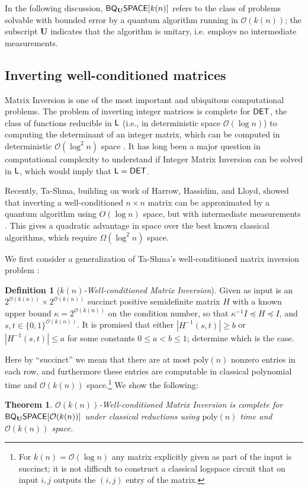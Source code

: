 \documentclass[11pt]{article}
\newtheorem{theorem}{Theorem}
\theoremstyle{definition}
\theoremstyle{remark}
\theoremstyle{definition}
\newtheorem{definition}{Definition}
\newcommand\DET{{\sf{DET}}}
\newcommand\Logspace{{\sf{L}}}
\newcommand\matrixinvert[1]{{\ensuremath{#1}}\textit{-Well-conditioned Matrix Inversion}}
\newcommand{\classfont}{\sf}
\newcommand{\Unitary}{\mathbf{U}}
\newcommand{\unitaryBQSPACE}[1]{{\classfont{BQ}_\Unitary\classfont{SPACE}}[#1]}
\newcommand\bigoh{\mathcal{O}}
\newcommand{\poly}{\textrm{poly}}
\begin{document}
In the following discussion, $\unitaryBQSPACE{k(n)}$ refers to the class of problems solvable with bounded error by a quantum algorithm running in $\mathcal{O}(k(n))$; the subscript $\Unitary$ indicates that the algorithm is unitary, i.e. employs no intermediate measurements.
\subsection{Inverting well-conditioned matrices}
Matrix Inversion is one of the most important and ubiquitous computational problems.  The problem of inverting integer matrices is complete for $\DET$, the class of functions reducible in $\Logspace$ (i.e., in deterministic space $\bigoh(\log{n})$) to computing the determinant of an integer matrix, which can be computed in deterministic $\bigoh(\log^2{n})$ space \cite{berkowitz, cook}.  It has long been a major question in computational complexity to understand if Integer Matrix Inversion can be solved in $\Logspace$, which would imply that $\Logspace=\DET$.

Recently, Ta-Shma, building on work of Harrow, Hassidim, and Lloyd, showed that inverting a well-conditioned $n \times n$ matrix can be approximated by a quantum algorithm using $O(\log n)$ space, but with intermediate measurements \cite{tashma,HHL}. This gives a quadratic advantage in space over the best known classical algorithms, which require $\Omega(\log^2n)$ space.

We first consider a generalization of Ta-Shma's well-conditioned matrix inversion problem \cite{tashma}:\begin{definition}[\matrixinvert{k(n)}]
	Given as input is an $2^{\bigoh (k(n))} \times 2^{\bigoh (k(n))}$ succinct positive semidefinite matrix $H$ with a known upper bound $\kappa = 2^{\mathcal{O}(k(n))}$ on the condition number, so that $\kappa^{-1}I\preceq H \preceq I$, and $s,t\in \lbrace 0,1\rbrace^{\bigoh(k(n))}$. It is promised that either $|H^{-1}(s,t)|\geq b$
 or $|H^{-1}(s,t)|\leq a$ for some constants $0 \le a < b \le 1$; determine which is the case.
 \end{definition}

Here by ``succinct'' we mean that there are at most $\poly(n)$ nonzero entries in each row, and furthermore these entries are computable in classical polynomial time and $\mathcal{O}(k(n))$ space.\footnote{For $k(n) = \mathcal{O}(\log n)$ any matrix explicitly given as part of the input is succinct; it is not difficult to construct a classical logspace circuit that on input $i,j$ outputs the $(i,j)$ entry of the matrix.} We show the following:
\begin{theorem}
\matrixinvert{\mathcal{O}(k(n))} is complete for $\unitaryBQSPACE{\mathcal{O}(k(n))}$ under classical reductions using $\poly(n)$ time and $\mathcal{O}(k(n))$ space.
\end{theorem}
\end{document}
